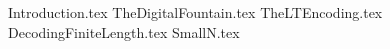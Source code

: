 \documentclass[12pt,a4paper,titlepage]{article}
\begin{document}
\lipsum[1]

{Introduction.tex}
{TheDigitalFountain.tex}
{TheLTEncoding.tex}
{DecodingFiniteLength.tex}
{SmallN.tex}



\end{document}

